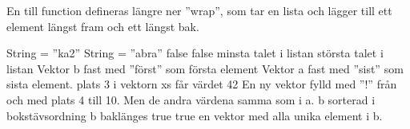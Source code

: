 En till function defineras längre ner ''wrap'', som tar en lista och lägger till ett element längst fram och ett längst bak.

\Task %
\Subtask  String = ''ka2''
\Subtask  String = ''abra''
\Subtask  false
\Subtask  false
\Subtask  minsta talet i listan
\Subtask  största talet i listan
\Subtask  Vektor b fast med ''först'' som första element
\Subtask  Vektor a fast med ''sist'' som sista element.
\Subtask  plats 3 i vektorn xs får värdet 42
\Subtask  En ny vektor fylld med ''!'' från och med plats 4 till 10. Men de andra värdena samma som i a.
\Subtask  b sorterad i bokstävsordning
\Subtask  b baklänges
\Subtask  true
\Subtask  true
\Subtask  en vektor med alla unika element i b.

\Task %

